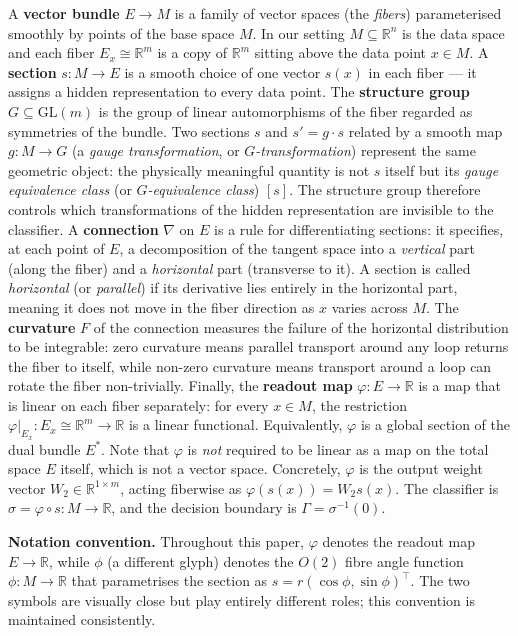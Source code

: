 \documentclass[11pt, a4paper]{article}
\theoremstyle{plain}
\theoremstyle{definition}
\newcommand{\R}{\mathbb{R}}
\newcommand{\GL}{\mathrm{GL}}
\newcommand{\Gam}{\Gamma}
\begin{document}
A \textbf{vector bundle} $E \to M$ is a family of vector spaces (the
\emph{fibers}) parameterised smoothly by points of the base space $M$. In our
setting $M \subseteq \R^n$ is the data space and each fiber $E_x \cong \R^m$ is a
copy of $\R^m$ sitting above the data point $x \in M$. A \textbf{section}
$s: M \to E$ is a smooth choice of one vector $s(x)$ in each fiber --- it assigns
a hidden representation to every data point. The \textbf{structure group}
$G \subseteq \GL(m)$ is the group of linear automorphisms of the fiber regarded
as symmetries of the bundle. Two sections $s$ and $s' = g \cdot s$ related by a
smooth map $g: M \to G$ (a \emph{gauge transformation}, or \emph{$G$-transformation})
represent the same geometric object: the physically meaningful quantity is not $s$
itself but its \emph{gauge equivalence class} (or \emph{$G$-equivalence class})
$[s]$. The structure group therefore controls which transformations of the hidden
representation are invisible to the classifier. A \textbf{connection} $\nabla$ on
$E$ is a rule for differentiating sections: it specifies, at each point of $E$,
a decomposition of the tangent space into a \emph{vertical} part (along the fiber)
and a \emph{horizontal} part (transverse to it). A section is called
\emph{horizontal} (or \emph{parallel}) if its derivative lies entirely in the
horizontal part, meaning it does not move in the fiber direction as $x$ varies
across $M$. The \textbf{curvature} $F$ of the connection measures the failure of
the horizontal distribution to be integrable: zero curvature means parallel
transport around any loop returns the fiber to itself, while non-zero curvature
means transport around a loop can rotate the fiber non-trivially. Finally, the
\textbf{readout map} $\varphi: E \to \R$ is a map that is linear on each fiber
separately: for every $x \in M$, the restriction $\varphi|_{E_x}: E_x \cong
\R^m \to \R$ is a linear functional. Equivalently, $\varphi$ is a global section
of the dual bundle $E^*$. Note that $\varphi$ is \emph{not} required to be linear
as a map on the total space $E$ itself, which is not a vector space. Concretely,
$\varphi$ is the output weight vector $W_2 \in \R^{1\times m}$, acting fiberwise
as $\varphi(s(x)) = W_2 s(x)$. The classifier is $\sigma = \varphi \circ s:
M \to \R$, and the decision boundary is $\Gam = \sigma^{-1}(0)$.

\textbf{Notation convention.} Throughout this paper, $\varphi$ denotes the
readout map $E \to \R$, while $\phi$ (a different glyph) denotes the $O(2)$
fibre angle function $\phi: M \to \R$ that parametrises the section as
$s = r(\cos\phi, \sin\phi)^\top$. The two symbols are visually close but play
entirely different roles; this convention is maintained consistently.
\end{document}
